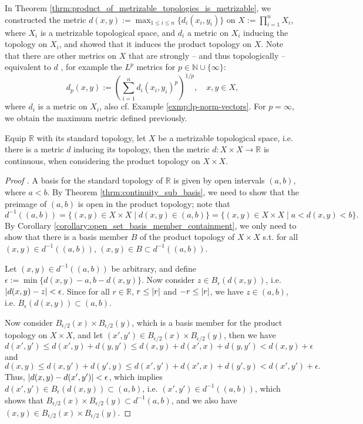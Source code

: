 \begin{remark}
	In Theorem \ref{thrm:product_of_metrizable_topologies_is_metrizable}, we constructed the metric $d(x, y) := \max_{1\leq i\leq n}\{d_i(x_i, y_i)\}$ on $X := \prod_{i=1}^{n}X_i$, where $X_i$ is a metrizable topological space, and $d_i$ a metric on $X_i$ inducing the topology on $X_i$, and showed that it induces the product topology on $X$. Note that there are other metrics on $X$ that are strongly -- and thus topologically -- equivalent to $d$ \cite{src:product_topology}, for example the $L^p$ metrics for $p\in \mathbb N\cup \{\infty\}$:
	$$d_p(x, y) := \left(\sum_{i=1}^{n}d_i(x_i, y_i)^p\right)^{1/p}, \quad x, y\in X,$$
	where $d_i$ is a metric on $X_i$, also cf. Example \ref{exmp:lp-norm-vectors}. For $p = \infty$, we obtain the maximum metric defined previously.
\end{remark}

\begin{theorem}
	Equip $\mathbb R$ with its standard topology, let $X$ be a metrizable topological space, i.e. there is a metric $d$ inducing its topology, then the metric $d: X\times X\to \mathbb R$ is continuous, when considering the product topology on $X\times X$.
\end{theorem}

\begin{proof}[Proof \cite{287313, 4228334}]
	A basis for the standard topology of $\mathbb R$ is given by open intervals $(a, b)$, where $a < b$. By Theorem \ref{thrm:continuity_sub_basis}, we need to show that the preimage of $(a, b)$ is open in the product topology; note that
	$$d^{-1}((a, b)) = \{(x, y)\in X\times X\mid d(x, y)\in (a, b)\} = \{(x, y)\in X\times X\mid a < d(x, y) < b\}.$$
	By Corollary \ref{corollary:open_set_basis_member_containment}, we only need to show that there is a basis member $B$ of the product topology of $X \times X$ s.t. for all $(x, y)\in d^{-1}((a, b))$, $(x, y)\in B\subset d^{-1}((a, b))$.
	
	Let $(x, y)\in d^{-1}((a, b))$ be arbitrary, and define $\epsilon := \min\{d(x, y) - a, b - d(x, y)\}$. Now consider $z\in B_{\epsilon}(d(x, y))$, i.e. $\left\vert d(x, y) - z \right\vert < \epsilon$. Since for all $r\in\mathbb R$, $r \leq \left\vert r \right\vert$ and $-r\leq \left\vert r \right\vert$, we have $z\in (a, b)$, i.e. $B_{\epsilon}(d(x, y))\subset (a, b)$.
	
	Now consider $B_{\epsilon/2}(x)\times B_{\epsilon/2}(y)$, which is a basis member for the product topology on $X\times X$, and let $(x', y')\in B_{\epsilon/2}(x)\times B_{\epsilon/2}(y)$, then we have
	$$d(x', y') \leq d(x', y) + d(y, y') \leq d(x, y) + d(x', x) + d(y, y') < d(x, y) + \epsilon$$
	and 
	$$d(x, y) \leq d(x, y') + d(y', y) \leq d(x', y') + d(x', x) + d(y', y) < d(x', y') + \epsilon.$$
	Thus, $\left\vert d(x, y)  - d(x', y') \right\vert < \epsilon$, which implies $d(x', y')\in B_{\epsilon}(d(x, y)) \subset (a, b)$, i.e. $(x', y')\in d^{-1}((a, b))$, which shows that $B_{\epsilon/2}(x)\times B_{\epsilon/2}(y) \subset d^{-1}(a, b)$, and we also have $(x, y)\in B_{\epsilon/2}(x)\times B_{\epsilon/2}(y)$.
\end{proof}

